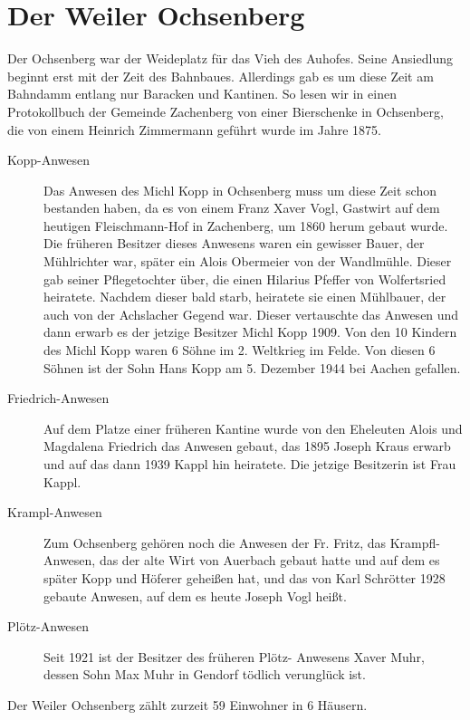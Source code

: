 \documentclass{book}
\begin{document}
\section{Der Weiler Ochsenberg}

Der Ochsenberg war der Weideplatz für das Vieh des Auhofes. Seine
Ansiedlung beginnt erst mit der Zeit des Bahnbaues. Allerdings gab es um
diese Zeit am Bahndamm entlang nur Baracken und Kantinen. So lesen wir
in einen Protokollbuch der Gemeinde Zachenberg von einer Bierschenke in
Ochsenberg, die von einem Heinrich Zimmermann geführt wurde im Jahre
1875.

\begin{description}
\item[Kopp-Anwesen] Das Anwesen des Michl Kopp in Ochsenberg muss um
diese Zeit schon bestanden haben, da es von einem Franz Xaver Vogl,
Gastwirt auf dem heutigen Fleischmann-Hof in Zachenberg, um 1860 herum
gebaut wurde. Die früheren Besitzer dieses Anwesens waren ein gewisser
Bauer, der Mühlrichter war, später ein Alois Obermeier von der
Wandlmühle. Dieser gab seiner Pflegetochter über, die einen Hilarius
Pfeffer von Wolfertsried heiratete. Nachdem dieser bald starb, heiratete
sie einen Mühlbauer, der auch von der Achslacher Gegend war. Dieser
vertauschte das Anwesen und dann erwarb es der jetzige Besitzer Michl
Kopp 1909. Von den 10 Kindern des Michl Kopp waren 6 Söhne im 2.
Weltkrieg im Felde. Von diesen 6 Söhnen ist der Sohn Hans Kopp am 5.
Dezember 1944 bei Aachen gefallen.

\item[Friedrich-Anwesen] Auf dem Platze einer früheren Kantine wurde von
den Eheleuten Alois und Magdalena Friedrich das Anwesen gebaut, das 1895
Joseph Kraus erwarb und auf das dann 1939 Kappl hin heiratete. Die
jetzige Besitzerin ist Frau Kappl.

\item[Krampl-Anwesen] Zum Ochsenberg gehören noch die Anwesen der Fr.
Fritz, das Krampfl-Anwesen, das der alte Wirt von Auerbach gebaut hatte
und auf dem es später Kopp und Höferer geheißen hat, und das von Karl
Schrötter 1928 gebaute Anwesen, auf dem es heute Joseph Vogl heißt.

\item[Plötz-Anwesen] Seit 1921 ist der Besitzer des früheren Plötz-
Anwesens Xaver Muhr, dessen Sohn Max Muhr in Gendorf tödlich verunglück
ist.
\end{description}

Der Weiler Ochsenberg zählt zurzeit 59 Einwohner in 6 Häusern.
\end{document}
